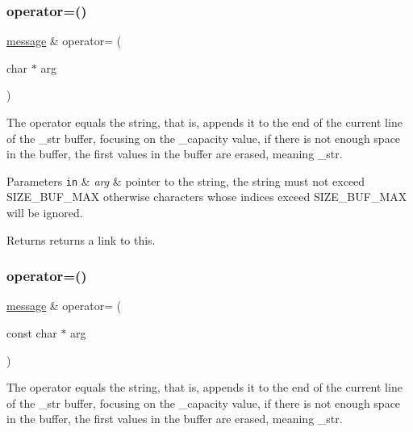\subsubsection{\texorpdfstring{operator=()}{operator=()}\hspace{0.1cm}{\footnotesize\ttfamily [1/2]}}
{\footnotesize\ttfamily \hyperlink{classmessage}{message} \& operator= (\begin{DoxyParamCaption}\item[{char $\ast$}]{arg }\end{DoxyParamCaption})}



The operator equals the string, that is, appends it to the end of the current line of the \+\_\+str buffer, focusing on the \+\_\+capacity value, if there is not enough space in the buffer, the first values in the buffer are erased, meaning \+\_\+str. 


\begin{DoxyParams}[1]{Parameters}
\mbox{\tt in}  & {\em arg} & pointer to the string, the string must not exceed S\+I\+Z\+E\+\_\+\+B\+U\+F\+\_\+\+M\+AX otherwise characters whose indices exceed S\+I\+Z\+E\+\_\+\+B\+U\+F\+\_\+\+M\+AX will be ignored. \\
\hline
\end{DoxyParams}
\begin{DoxyReturn}{Returns}
returns a link to this. 
\end{DoxyReturn}
\mbox{\label{classmessage_a6264b8942d815bd3d999b2a9b6475825}} 
\subsubsection{\texorpdfstring{operator=()}{operator=()}\hspace{0.1cm}{\footnotesize\ttfamily [2/2]}}
{\footnotesize\ttfamily \hyperlink{classmessage}{message} \& operator= (\begin{DoxyParamCaption}\item[{const char $\ast$}]{arg }\end{DoxyParamCaption})}



The operator equals the string, that is, appends it to the end of the current line of the \+\_\+str buffer, focusing on the \+\_\+capacity value, if there is not enough space in the buffer, the first values in the buffer are erased, meaning \+\_\+str. 



